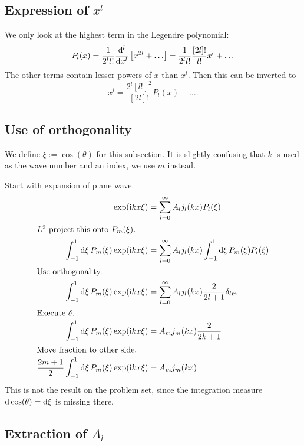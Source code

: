 \documentclass[11pt, english, fleqn, DIV=15, headinclude, BCOR=1.5cm]{scrartcl}
\begin{document}
\subsection{Expression of $x^l$}

We only look at the highest term in the Legendre polynomial:
\[
    P_l(x)
    = \frac{1}{2^l l!} \frac{\mathop{}\!\mathrm d {^l}}{\mathop{}\!\mathrm d {x^l}} \left[ x^{2l} + \ldots \right]
    = \frac{1}{2^l l!} \frac{[2l]!}{l!} x^{l} + \ldots
\]
The other terms contain lesser powers of $x$ than $x^l$. Then this can be
inverted to
\[
    x^l = \frac{2^l [l!]^2}{[2l]!} P_l(x) + \ldots.
\]

\subsection{Use of orthogonality}

We define $\xi := \cos(\theta)$ for this subsection. It is slightly confusing
that $k$ is used as the wave number and an index, we use $m$ instead.

Start with expansion of plane wave.
\begin{align*}
    \exp(\iup k x \xi) &= \sum_{l = 0}^\infty A_l j_l(kx) P_l(\xi) \\
    \intertext{%
        $L^2$ project this onto $P_m(\xi)$.
    }
    \int_{-1}^1 \dif \xi \, P_m(\xi) \exp(\iup k x \xi) &= \sum_{l = 0}^\infty A_l
    j_l(kx) \int_{-1}^1 \dif \xi \, P_m(\xi) P_l(\xi) \\
    \intertext{%
        Use orthogonality.
    }
    \int_{-1}^1 \dif \xi \, P_m(\xi) \exp(\iup k x \xi) &= \sum_{l = 0}^\infty A_l
    j_l(kx) \frac{2}{2l+1} \delta_{lm} \\
    \intertext{%
        Execute $\delta$.
    }
    \int_{-1}^1 \dif \xi \, P_m(\xi) \exp(\iup k x \xi) &= A_m
    j_m(kx) \frac{2}{2k+1} \\
    \intertext{%
        Move fraction to other side.
    }
    \frac{2m+1}{2} \int_{-1}^1 \dif \xi \, P_m(\xi) \exp(\iup k x \xi) &= A_m
    j_m(kx)
\end{align*}
This is not the result on the problem set, since the integration measure
$\mathop{}\!\mathrm d\cos(\theta) = \mathop{}\!\mathrm d\xi$ is missing there.

\subsection{Extraction of $A_l$}
\end{document}

